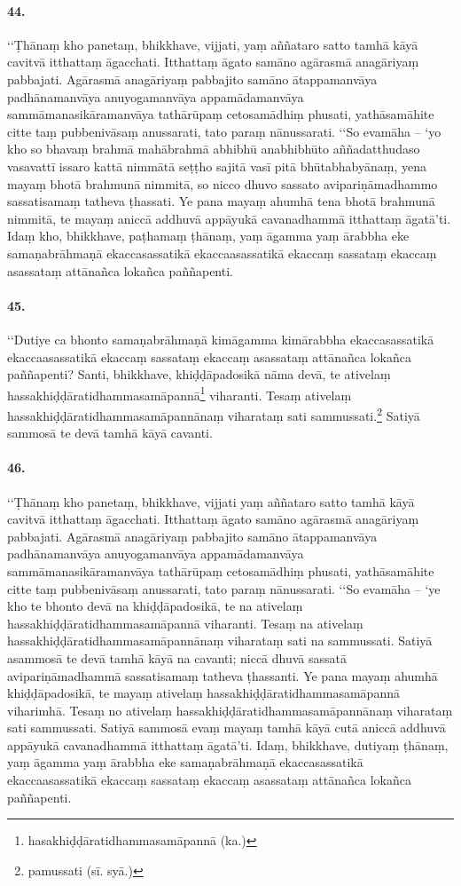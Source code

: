 \paragraph{44.}
‘‘Ṭhānaṃ kho panetaṃ, bhikkhave, vijjati, yaṃ aññataro satto tamhā kāyā cavitvā itthattaṃ āgacchati. Itthattaṃ āgato samāno agārasmā anagāriyaṃ pabbajati. Agārasmā anagāriyaṃ pabbajito samāno ātappamanvāya padhānamanvāya anuyogamanvāya appamādamanvāya sammāmanasikāramanvāya tathārūpaṃ cetosamādhiṃ phusati, yathāsamāhite citte taṃ pubbenivāsaṃ anussarati, tato paraṃ nānussarati. ‘‘So evamāha – ‘yo kho so bhavaṃ brahmā mahābrahmā abhibhū anabhibhūto aññadatthudaso vasavattī issaro kattā nimmātā seṭṭho sajitā vasī pitā bhūtabhabyānaṃ, yena mayaṃ bhotā brahmunā nimmitā, so nicco dhuvo sassato avipariṇāmadhammo sassatisamaṃ tatheva ṭhassati. Ye pana mayaṃ ahumhā tena bhotā brahmunā nimmitā, te mayaṃ aniccā addhuvā appāyukā cavanadhammā itthattaṃ āgatā’ti. Idaṃ kho, bhikkhave, paṭhamaṃ ṭhānaṃ, yaṃ āgamma yaṃ ārabbha eke samaṇabrāhmaṇā ekaccasassatikā ekaccaasassatikā ekaccaṃ sassataṃ ekaccaṃ asassataṃ attānañca lokañca paññapenti.

\paragraph{45.}
‘‘Dutiye ca bhonto samaṇabrāhmaṇā kimāgamma kimārabbha ekaccasassatikā ekaccaasassatikā ekaccaṃ sassataṃ ekaccaṃ asassataṃ attānañca lokañca paññapenti? Santi, bhikkhave, khiḍḍāpadosikā nāma devā, te ativelaṃ hassakhiḍḍāratidhammasamāpannā\footnote{hasakhiḍḍāratidhammasamāpannā (ka.)} viharanti. Tesaṃ ativelaṃ hassakhiḍḍāratidhammasamāpannānaṃ viharataṃ sati sammussati.\footnote{pamussati (sī. syā.)} Satiyā sammosā te devā tamhā kāyā cavanti.

\paragraph{46.}
‘‘Ṭhānaṃ kho panetaṃ, bhikkhave, vijjati yaṃ aññataro satto tamhā kāyā cavitvā itthattaṃ āgacchati. Itthattaṃ āgato samāno agārasmā anagāriyaṃ pabbajati. Agārasmā anagāriyaṃ pabbajito samāno ātappamanvāya padhānamanvāya anuyogamanvāya appamādamanvāya sammāmanasikāramanvāya tathārūpaṃ cetosamādhiṃ phusati, yathāsamāhite citte taṃ pubbenivāsaṃ anussarati, tato paraṃ nānussarati. ‘‘So evamāha – ‘ye kho te bhonto devā na khiḍḍāpadosikā, te na ativelaṃ hassakhiḍḍāratidhammasamāpannā viharanti. Tesaṃ na ativelaṃ hassakhiḍḍāratidhammasamāpannānaṃ viharataṃ sati na sammussati. Satiyā asammosā te devā tamhā kāyā na cavanti; niccā dhuvā sassatā avipariṇāmadhammā sassatisamaṃ tatheva ṭhassanti. Ye pana mayaṃ ahumhā khiḍḍāpadosikā, te mayaṃ ativelaṃ hassakhiḍḍāratidhammasamāpannā viharimhā. Tesaṃ no ativelaṃ hassakhiḍḍāratidhammasamāpannānaṃ viharataṃ sati sammussati. Satiyā sammosā evaṃ mayaṃ tamhā kāyā cutā aniccā addhuvā appāyukā cavanadhammā itthattaṃ āgatā’ti. Idaṃ, bhikkhave, dutiyaṃ ṭhānaṃ, yaṃ āgamma yaṃ ārabbha eke samaṇabrāhmaṇā ekaccasassatikā ekaccaasassatikā ekaccaṃ sassataṃ ekaccaṃ asassataṃ attānañca lokañca paññapenti.

